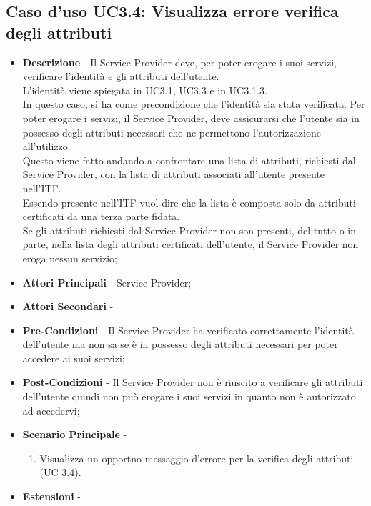 \subsection{Caso d'uso UC3.4: Visualizza errore verifica degli attributi}
\begin{itemize}
	\item \textbf{Descrizione} - Il Service Provider deve, per poter erogare i suoi servizi, verificare l'identità e gli attributi dell'utente.\\
	L'identità viene spiegata in UC3.1, UC3.3 e in UC3.1.3.\\
	In questo caso, si ha come precondizione che l'identità sia stata verificata.
	Per poter erogare i servizi, il Service Provider, deve assicurarsi che l'utente sia in possesso degli attributi necessari che ne permettono l'autorizzazione all'utilizzo.\\
	Questo viene fatto andando a confrontare una lista di attributi, richiesti dal Service Provider, con la lista di attributi associati all'utente presente nell'\gls{ITF}.\\
	Essendo presente nell'\gls{ITF} vuol dire che la lista è composta solo da attributi certificati da una terza parte fidata.\\
	Se gli attributi richiesti dal Service Provider non son presenti, del tutto o in parte, nella lista degli attributi certificati dell'utente, il Service Provider non eroga nessun servizio;
	\item \textbf{Attori Principali} - Service Provider;
	\item \textbf{Attori Secondari} -
	\item \textbf{Pre-Condizioni} - Il Service Provider ha verificato correttamente l'identità dell'utente ma non sa se è in possesso degli attributi necessari per poter accedere ai suoi servizi;
	\item \textbf{Post-Condizioni} - Il Service Provider non è riuscito a verificare gli attributi dell'utente quindi non può erogare i suoi servizi in quanto non è autorizzato ad accedervi;
	\item \textbf{Scenario Principale} -
	\begin{enumerate}
		\item Visualizza un opportno messaggio d'errore per la verifica degli attributi (UC 3.4).
	\end{enumerate}
	\item \textbf{Estensioni} -
\end{itemize}
\newpage
